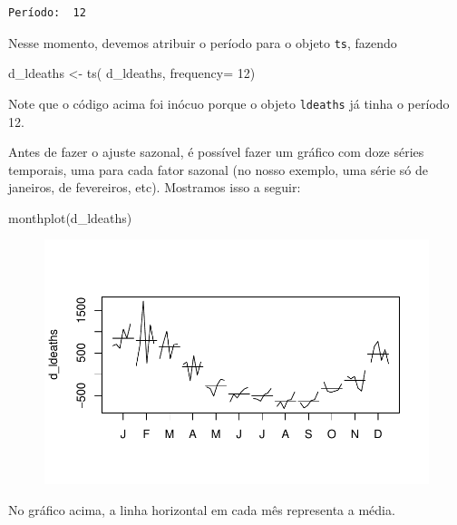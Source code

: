 \documentclass[
  letterpaper,
  DIV=11,
  numbers=noendperiod]{scrreprt}
\newenvironment{Shaded}{\begin{snugshade}}{\end{snugshade}}
\newcommand{\AttributeTok}[1]{\textcolor[rgb]{0.40,0.45,0.13}{#1}}
\newcommand{\DecValTok}[1]{\textcolor[rgb]{0.68,0.00,0.00}{#1}}
\newcommand{\FunctionTok}[1]{\textcolor[rgb]{0.28,0.35,0.67}{#1}}
\newcommand{\NormalTok}[1]{\textcolor[rgb]{0.00,0.23,0.31}{#1}}
\newcommand{\OtherTok}[1]{\textcolor[rgb]{0.00,0.23,0.31}{#1}}
\begin{document}
\begin{verbatim}
Período:  12 
\end{verbatim}

Nesse momento, devemos atribuir o período para o objeto \texttt{ts},
fazendo

\begin{Shaded}
\begin{Highlighting}[]
\NormalTok{d\_ldeaths }\OtherTok{\textless{}{-}} \FunctionTok{ts}\NormalTok{( d\_ldeaths, }\AttributeTok{frequency=} \DecValTok{12}\NormalTok{) }
\end{Highlighting}
\end{Shaded}

Note que o código acima foi inócuo porque o objeto \texttt{ldeaths} já
tinha o período 12.

Antes de fazer o ajuste sazonal, é possível fazer um gráfico com doze
séries temporais, uma para cada fator sazonal (no nosso exemplo, uma
série só de janeiros, de fevereiros, etc). Mostramos isso a seguir:

\begin{Shaded}
\begin{Highlighting}[]
\FunctionTok{monthplot}\NormalTok{(d\_ldeaths)}
\end{Highlighting}
\end{Shaded}

\begin{figure}[H]

{\centering \includegraphics{ferramentas_files/figure-pdf/unnamed-chunk-19-1.pdf}

}

\end{figure}

No gráfico acima, a linha horizontal em cada mês representa a média.
\end{document}
